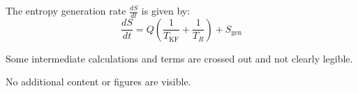 The entropy generation rate \( \frac{dS}{dt} \) is given by:  
\[
\frac{dS}{dt} = Q \left( \frac{1}{T_{\text{KF}}} + \frac{1}{T_R} \right) + S_{\text{gen}}
\]  

Some intermediate calculations and terms are crossed out and not clearly legible.  

No additional content or figures are visible.